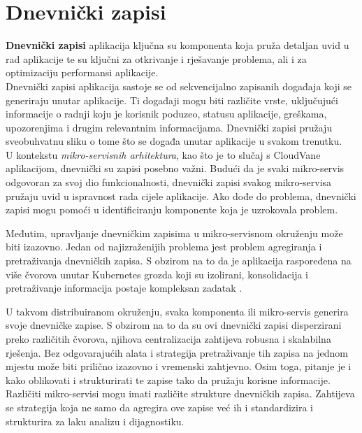 \documentclass[times, utf8, diplomski]{fer}
\begin{document}
\clearpage
\section{Dnevnički zapisi}
\label{sec:logs}

\textbf{Dnevnički zapisi} aplikacija  ključna su komponenta koja pruža detaljan uvid u rad aplikacije te su ključni za otkrivanje i rješavanje problema, ali i za optimizaciju performansi aplikacije.\\

Dnevnički zapisi aplikacija sastoje se od sekvencijalno zapisanih događaja koji se generiraju unutar aplikacije. Ti događaji mogu biti različite vrste, uključujući informacije o radnji koju je korisnik poduzeo, statusu aplikacije, greškama, upozorenjima i drugim relevantnim informacijama. Dnevnički zapisi pružaju sveobuhvatnu sliku o tome što se događa unutar aplikacije u svakom trenutku.\\

U kontekstu \emph{mikro-servisnih arhitektura}, kao što je to slučaj s CloudVane aplikacijom, dnevnički su zapisi posebno važni. Budući da je svaki mikro-servis odgovoran za svoj dio funkcionalnosti, dnevnički zapisi svakog mikro-servisa pružaju uvid u ispravnost rada cijele aplikacije. Ako dođe do problema, dnevnički zapisi mogu pomoći u identificiranju komponente koja je uzrokovala problem.

Međutim, upravljanje dnevničkim zapisima u mikro-servisnom okruženju može biti izazovno. Jedan od najizraženijih problema jest problem agregiranja i pretraživanja dnevničkih zapisa. S obzirom na to da je aplikacija raspoređena na više čvorova unutar Kubernetes grozda koji su izolirani, konsolidacija i pretraživanje informacija postaje kompleksan zadatak \citep{newman_building_2015}.

U takvom distribuiranom okruženju, svaka komponenta ili mikro-servis generira svoje dnevničke zapise. S obzirom na to da su ovi dnevnički zapisi disperzirani preko različitih čvorova, njihova centralizacija zahtijeva robusna i skalabilna rješenja. Bez odgovarajućih alata i strategija pretraživanje tih zapisa na jednom mjestu može biti prilično izazovno i vremenski zahtjevno. Osim toga, pitanje je i kako oblikovati i strukturirati te zapise tako da pružaju korisne informacije. Različiti mikro-servisi mogu imati različite strukture dnevničkih zapisa. Zahtijeva se strategija koja ne samo da agregira ove zapise već ih i standardizira i strukturira za laku analizu i dijagnostiku. \\
\end{document}
